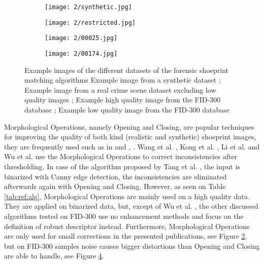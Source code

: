 \documentclass[draft,final]{vutinfth} %
\begin{document}
\begin{figure}[h]
  \centering
  \begin{subfigure}[t]{0.24\columnwidth}
    \centering
    \texttt{[image: 2/synthetic.jpg]}
    \subcaption{}
    \label{fig:rw:synthetic}
  \end{subfigure}
  \begin{subfigure}[t]{0.24\columnwidth}
    \centering
    \texttt{[image: 2/restricted.jpg]}
    \subcaption{}
    \label{fig:rw:restricted}
  \end{subfigure}
  \begin{subfigure}[t]{0.24\columnwidth}
    \centering
    \texttt{[image: 2/00025.jpg]}
    \subcaption{}
    \label{fig:rw:highFID}
  \end{subfigure}
  \begin{subfigure}[t]{0.24\columnwidth}
    \centering
    \texttt{[image: 2/00174.jpg]}
    \subcaption{}
    \label{fig:rw:lowFID}
  \end{subfigure}
  \caption{Example images of the different datasets of the forensic shoeprint matching algorithms
	 Example image from a synthetic dataset \cite{alizadeh2017automatic};  Example image from a real crime scene dataset excluding low quality images \cite{li2014retrieval};  Example high quality image from the FID-300 database \cite{kortylewski2014unsupervised};  Example low quality image from the FID-300 database \cite{kortylewski2014unsupervised}}
  \label{fig:rw:database}
\end{figure}

\par
Morphological Operations, namely Opening and Closing, are popular techniques for improving the quality of both kind (realistic and synthetic) shoeprint images, they are frequently used such as in \cite{wang2014automatic} and  \cite{kong2014novel}, \cite{li2014retrieval}.
Wang et al. \cite{wang2014automatic}, Kong et al.  \cite{kong2014novel}, Li et al. \cite{li2014retrieval} and  Wu et al. \cite{wu2019crime}use the Morphological Operations to correct inconsistencies after thresholding.
In case of the algorithm proposed by Tang et al. \cite{tang2010footwear}, the input is binarized with Canny edge detection, the inconsistencies are eliminated afterwards again with Opening and Closing.
However, as seen on Table \ref{tab:ref:alg}, Morphological Operations are mainly used on a high quality data.
They are applied on binarized data, but, except of Wu et al. \cite{wu2019crime}, the other discussed algorithms tested on FID-300 use no enhancement methods and focus on the definition of robust descriptor instead.
Furthermore, Morphological Operations are only used for small corrections in the presented publications, see Figure \ref{fig:rw:restricted}, but on FID-300 samples noise causes bigger distortions than Opening and Closing are able to handle, see Figure \ref{fig:rw:lowFID}.
\end{document}
